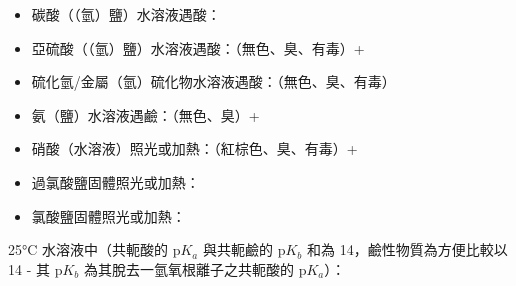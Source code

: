 \documentclass[a4paper,12pt]{report}
\begin{document}
\begin{itemize}
\item 碳酸（（氫）鹽）水溶液遇酸：
\item 亞硫酸（（氫）鹽）水溶液遇酸：（無色、臭、有毒）+
\item 硫化氫/金屬（氫）硫化物水溶液遇酸：（無色、臭、有毒）
\item 氨（鹽）水溶液遇鹼：（無色、臭）+
\item 硝酸（水溶液）照光或加熱：（紅棕色、臭、有毒）+
\item 過氯酸鹽固體照光或加熱：
\item 氯酸鹽固體照光或加熱：
\end{itemize}
25°C 水溶液中（共軛酸的 p$K_a$ 與共軛鹼的 p$K_b$ 和為 14，鹼性物質為方便比較以 14 - 其 p$K_b$ 為其脫去一氫氧根離子之共軛酸的 p$K_a$）：
\end{document}
